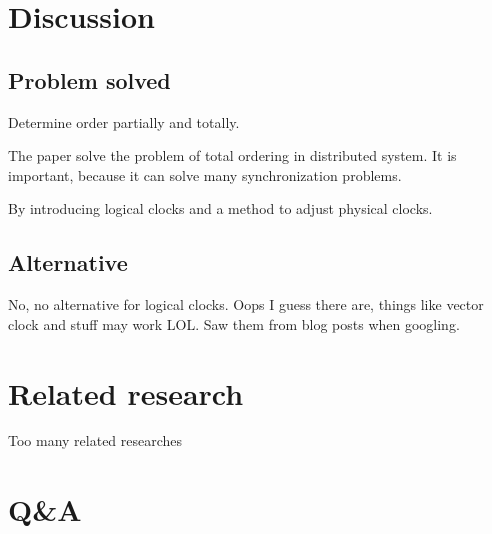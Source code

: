 \documentclass[12pt,a4paper,oneside]{article}
\begin{document}
\section{Discussion}



\subsection{Problem solved}

Determine order partially and totally. %

The paper solve the problem of total ordering in distributed system.
It is important, because it can solve many synchronization problems.

By introducing logical clocks and a method to adjust physical clocks.

\subsection{Alternative}

No, no alternative for logical clocks. Oops I guess there are, things
like vector clock and stuff may work LOL. Saw them from blog posts when googling.

\section{Related research}

Too many related researches

\section{Q\&A}
\end{document}
